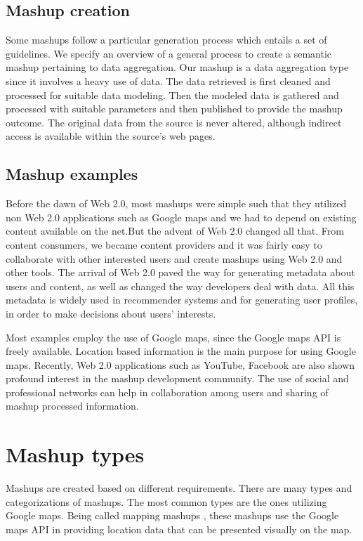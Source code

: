 \subsection{Mashup creation}
Some mashups follow a particular generation process which entails a set of guidelines. We specify an overview of a general process to create a semantic mashup pertaining to data aggregation. Our mashup is a data aggregation type since it involves a heavy use of data. The data retrieved is first cleaned and processed for suitable data modeling. Then the modeled data is gathered and processed with suitable parameters and then published to provide the mashup outcome. The original data from the source is never altered, although indirect access is available within the source’s web pages.

\subsection{Mashup examples}
Before the dawn of Web 2.0, most mashups were simple such that they utilized non Web 2.0 applications such as Google maps and we had to depend on existing content available on the net.But the advent of Web 2.0 changed all that. From content consumers, we became content providers and it was fairly easy to collaborate with other interested users and create mashups using Web 2.0 and other tools. The arrival of Web 2.0 paved the way for generating metadata about users and content, as well as changed the way developers deal with data. All this metadata is widely used in recommender systems and for generating user profiles, in order to make decisions about users’ interests.

Most examples employ the use of Google maps, since the Google maps API is freely available. Location based information is the main purpose for using Google maps. Recently, Web 2.0 applications such as YouTube, Facebook are also shown profound interest in the mashup development community. The use of social and professional networks can help in collaboration among users and sharing of mashup processed information.


\section{Mashup types}
Mashups are created based on different requirements. There are many types and categorizations of mashups. The most common types are the ones utilizing Google maps. Being called mapping mashups \cite{4}, these mashups use the Google maps API in providing location data that can be presented visually on the map.

